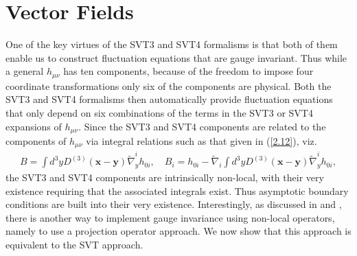 \section{Vector Fields}
\label{aas:vector_fields}

One of the key virtues of the  SVT3 and SVT4 formalisms is that both of them enable us to construct fluctuation equations that are gauge invariant. Thus  while a general $h_{\mu\nu}$ has ten components, because of the freedom to impose four coordinate transformations only six of the components are physical. Both the SVT3 and SVT4 formalisms then automatically provide fluctuation equations that only depend on six combinations of the terms in the SVT3 or SVT4 expansions of $h_{\mu\nu}$. Since the SVT3 and SVT4 components are related to the components of $h_{\mu\nu}$ via integral relations such as that given in (\ref{2.12}), viz. 
%
\begin{eqnarray}
B=\int d^3yD^{(3)}(\mathbf{x}-\mathbf{y})\tilde{\nabla}_y^ih_{0i},\quad B_i=h_{0i}-\tilde{\nabla}_i\int d^3yD^{(3)}(\mathbf{x}-\mathbf{y})\tilde{\nabla}_y^ih_{0i},
\label{A.1a}
\end{eqnarray}
%
the SVT3 and SVT4 components are intrinsically non-local, with their very existence requiring that the associated integrals exist. Thus asymptotic boundary conditions are built into their very existence. Interestingly, as discussed in \cite{mannheim_2005} and \cite{amarasinghe_2019},  there is another way to implement gauge invariance using non-local operators, namely to use a projection operator approach.   We now show that this approach is equivalent to the SVT approach.

